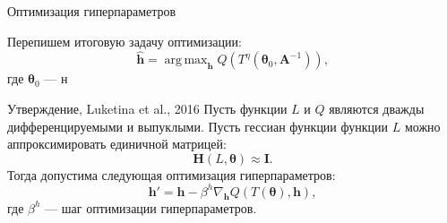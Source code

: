 \documentclass[usenames,dvipsnames,11pt,pdf,utf8,russian,aspectratio=169]{beamer}
\DeclareMathOperator*{\argmax}{arg\,max}
\begin{document}
\begin{frame}{Оптимизация гиперпараметров}

Перепишем итоговую задачу оптимизации:
\[
	\hat{\mathbf{h}} = \argmax_{\mathbf{h}} Q( T^\eta(\boldsymbol{\theta}_0, \mathbf{A}^{-1})),
\]
где $\boldsymbol{\theta}_0$ --- н
\begin{block}{Утверждение, Luketina et al., 2016}
Пусть функции $L$ и $Q$ являются дважды дифференцируемыми и выпуклыми. 
Пусть гессиан функции функции $L$ можно аппроксимировать единичной матрицей:
\[
    \mathbf{H}(L, \boldsymbol{\theta}) \approx \mathbf{I}.
\]
Тогда допустима следующая оптимизация гиперпараметров:
\[
    \mathbf{h}' = \mathbf{h} - \beta^{h} \nabla_{\mathbf{h}} Q(T(\boldsymbol{\theta}), \mathbf{h}),
\]
где $\beta^{h}$ --- шаг оптимизации гиперпараметров.
\end{block}
\end{frame}
\end{document}
